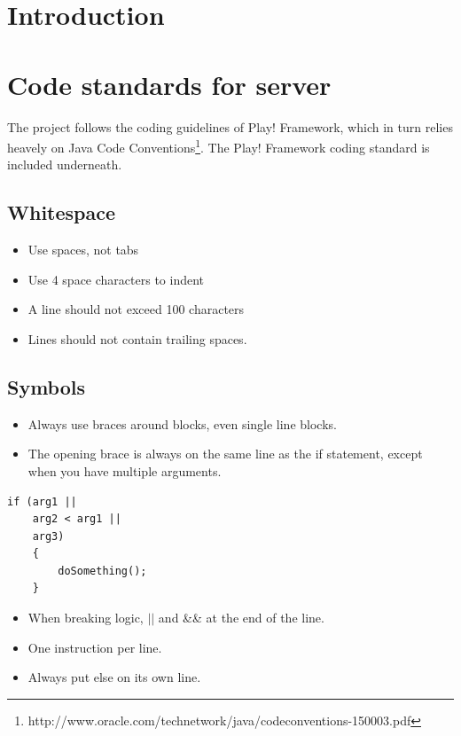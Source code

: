 \documentclass[11pt]{book}
\begin{document}
\section{Introduction}

\section{Code standards for server}\label{sec:codeStandard}
The project follows the coding guidelines of Play! Framework\cite{playCodingStandard}, which in turn relies heavely on Java Code Conventions\footnote{http://www.oracle.com/technetwork/java/codeconventions-150003.pdf}. The Play! Framework coding standard is included underneath.

\subsection{Whitespace}
\begin{itemize}
	\item Use spaces, not tabs
	\item Use 4 space characters to indent
	\item A line should not exceed 100 characters
	\item Lines should not contain trailing spaces.
\end{itemize}

\subsection{Symbols}
\begin{itemize}
	\item Always use braces around blocks, even single line blocks.
	\item The opening brace is always on the same line as the if statement, except when you have multiple arguments.
\end{itemize}
\lstset{language=Java}
\begin{lstlisting}[frame=single]
if (arg1 ||
    arg2 < arg1 ||
    arg3)
    {
        doSomething();
    }
\end{lstlisting}
\begin{itemize}
	\item When breaking logic, $||$ and \&\& at the end of the line.
	\item One instruction per line.
	\item Always put else on its own line.
\end{itemize}
\end{document}
